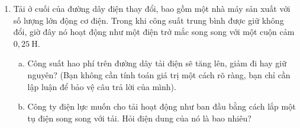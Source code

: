 \begin{vd}
\begin{enumerate}[1.]
    \item Tải ở cuối của đường dây điện thay đổi, bao gồm một nhà máy sản xuất với số lượng lớn động cơ điện. Trong khi công suất trung bình được giữ không đổi, giờ đây nó hoạt động như một điện trở mắc song song với một cuộn cảm $0,25~\mathrm{H}$.
    \begin{enumerate}[a.]
        \item Công suất hao phí trên đường dây tải điện sẽ tăng lên, giảm đi hay giữ nguyên? (Bạn không cần tính toán giá trị một cách rõ ràng, bạn chỉ cần lập luận để bảo vệ câu trả lời của mình).
        \item Công ty điện lực muốn cho tải hoạt động như ban đầu bằng cách lắp một tụ điện song song với tải. Hỏi điện dung của nó là bao nhiêu?
    \end{enumerate}
\end{enumerate}
\end{vd}
